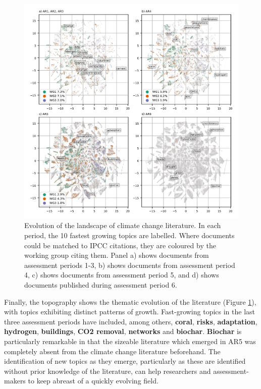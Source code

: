 \documentclass{article}
\begin{document}
\begin{linenumbers}
		
		\begin{figure}
			\begin{center}
				\includegraphics[width=180mm]{../plots_pub/topic_evolution_4.png}
				\caption{Evolution of the landscape of climate change literature. In each period, the 10 fastest growing topics are labelled. Where documents could be matched to IPCC citations, they are coloured by the working group citing them. Panel a) shows documents from assessment periods 1-3, b) shows documents from assessment period 4, c) shows documents from assessment period 5, and d) shows documents published during assessment period 6.}
				\label{evolution-map}
			\end{center}
		\end{figure}
		
		Finally, the topography shows the thematic evolution of the literature (Figure \ref{evolution-map}), with topics exhibiting distinct patterns of growth. Fast-growing topics in the last three assessment periods have included, among others, \textbf{coral}, \textbf{risks}, \textbf{adaptation}, \textbf{hydrogen}, \textbf{buildings}, \textbf{CO2 removal}, \textbf{networks} and \textbf{biochar}. \textbf{Biochar} is particularly remarkable in that the sizeable literature which emerged in AR5 was completely absent from the climate change literature beforehand. 
		The identification of new topics as they emerge, particularly as these are identified without prior knowledge of the literature, can help researchers and assessment-makers to keep abreast of a quickly evolving field.
		

\end{linenumbers}
\end{document}
